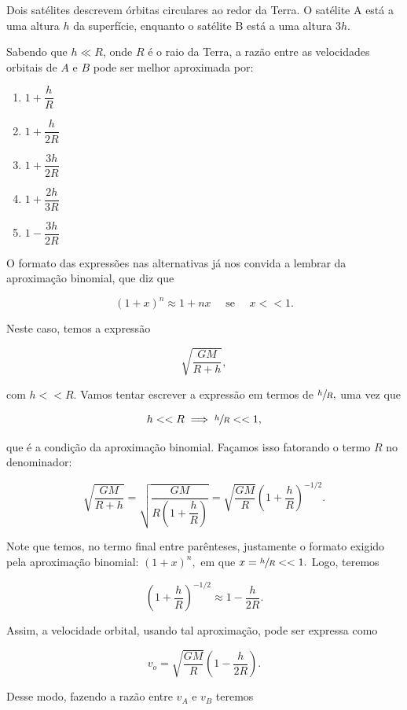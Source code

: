 \begin{exemplo}\label{exemplo_gravitacao_velocidadeorbitalex03}


Dois satélites descrevem órbitas circulares ao redor da Terra. O satélite A está a uma altura $h$ da superfície, enquanto o satélite B está a uma altura $3h$.

Sabendo que $h \ll R$, onde $R$ é o raio da Terra, a razão entre as velocidades orbitais de $A$ e $B$ pode ser melhor aproximada por:

\begin{enumerate}
    \item [a)] $1 + \dfrac{h}{R}$
    \item [b)] $1 + \dfrac{h}{2R}$
    \item [c)] $1 + \dfrac{3h}{2R}$
    \item [d)] $1 + \dfrac{2h}{3R}$
    \item [e)] $1 - \dfrac{3h}{2R}$
\end{enumerate}


\resolucao

O formato das expressões nas alternativas já nos convida a lembrar da aproximação binomial, que diz que

$$ (1+x)^n \approx 1 +nx \quad \text{ se } \quad x<<1.$$

Neste caso, temos a expressão

$$ \sqrt{\dfrac{GM}{R+h}},$$

\noindent com $h<<R.$ Vamos tentar escrever a expressão em termos de $\sfrac{h}{R},$ uma vez que 

$$h<<R \implies \sfrac{h}{R} << 1,$$ 

\noindent que é a condição da aproximação binomial. Façamos isso fatorando o termo $R$ no denominador:

$$ \sqrt{\dfrac{GM}{R+h}} = \sqrt{\dfrac{GM}{R \left(1+ \dfrac{h}{R} \right)}} = \sqrt{\dfrac{GM}{R}} \left( 1+ \dfrac{h}{R}\right)^{-1/2}. $$

Note que temos, no termo final entre parênteses, justamente o formato exigido pela aproximação binomial: $(1+x)^n,$ em que $x=\sfrac{h}{R}<<1.$ Logo, teremos

$$ \left( 1+ \dfrac{h}{R}\right)^{-1/2} \approx 1 -\dfrac{h}{2R}.$$ 

Assim, a velocidade orbital, usando tal aproximação, pode ser expressa como

$$ v_o =  \sqrt{\dfrac{GM}{R}} \left( 1 -\dfrac{h}{2R} \right). $$

Desse modo, fazendo a razão entre $v_A$ e $v_B$ teremos


\end{exemplo}
